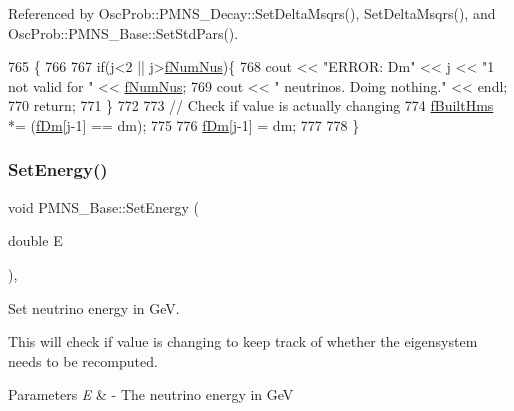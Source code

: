 Referenced by Osc\+Prob\+::\+P\+M\+N\+S\+\_\+\+Decay\+::\+Set\+Delta\+Msqrs(), Set\+Delta\+Msqrs(), and Osc\+Prob\+::\+P\+M\+N\+S\+\_\+\+Base\+::\+Set\+Std\+Pars().


\begin{DoxyCode}
765 \{
766 
767   \textcolor{keywordflow}{if}(j<2 || j>\hyperlink{classOscProb_1_1PMNS__Base_a24bb74bed63569dfe88b18fa6a08060e}{fNumNus})\{
768     cout << \textcolor{stringliteral}{"ERROR: Dm"} << j << \textcolor{stringliteral}{"1 not valid for "} << \hyperlink{classOscProb_1_1PMNS__Base_a24bb74bed63569dfe88b18fa6a08060e}{fNumNus};
769     cout << \textcolor{stringliteral}{" neutrinos. Doing nothing."} << endl;
770     \textcolor{keywordflow}{return};
771   \}
772 
773   \textcolor{comment}{// Check if value is actually changing}
774   \hyperlink{classOscProb_1_1PMNS__Base_a9ac3cadeac8db1b90f3152f476244780}{fBuiltHms} *= (\hyperlink{classOscProb_1_1PMNS__Base_a406a31c3b5d620e5a0cace5b411f9f70}{fDm}[j-1] == dm);
775 
776   \hyperlink{classOscProb_1_1PMNS__Base_a406a31c3b5d620e5a0cace5b411f9f70}{fDm}[j-1] = dm;
777 
778 \}
\end{DoxyCode}
\mbox{\label{classOscProb_1_1PMNS__Base_a95b3b0d0cab5e6a54b5ef99587f837c0}} 
\subsubsection{\texorpdfstring{Set\+Energy()}{SetEnergy()}}
{\footnotesize\ttfamily void P\+M\+N\+S\+\_\+\+Base\+::\+Set\+Energy (\begin{DoxyParamCaption}\item[{double}]{E }\end{DoxyParamCaption})\hspace{0.3cm}{\ttfamily [virtual]}, {\ttfamily [inherited]}}

Set neutrino energy in GeV.

This will check if value is changing to keep track of whether the eigensystem needs to be recomputed.


\begin{DoxyParams}{Parameters}
{\em E} & -\/ The neutrino energy in GeV \\
\hline
\end{DoxyParams}



